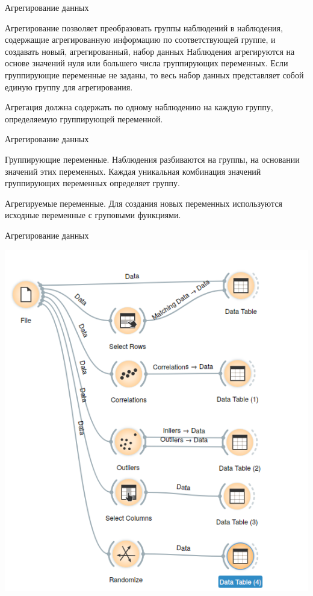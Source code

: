 \documentclass{beamer}
\begin{document}
\begin{frame}{Агрегирование данных} 

Агрегирование  позволяет преобразовать группы наблюдений в наблюдения,
 содержащие агрегированную информацию по соответствующей группе, 
 и создавать новый, агрегированный, набор  данных Наблюдения агрегируются 
 на основе значений нуля или большего числа группирующих переменных. 
 Если группирующие переменные не заданы, то весь набор данных представляет 
 собой единую группу для агрегирования.

 Агрегация должна  содержать по одному наблюдению на каждую группу, определяемую группирующей переменной. 

\end{frame}



\begin{frame}{Агрегирование данных} 

Группирующие переменные. Наблюдения разбиваются на группы, на основании значений этих переменных. Каждая уникальная комбинация значений группирующих переменных определяет группу. 

Агрегируемые переменные. Для создания новых переменных используются исходные переменные с груповыми функциями.  



\end{frame}

\begin{frame}{Агрегирование данных} 

\includegraphics[scale=0.3]{task05_01.png}

\end{frame}
\end{document}
